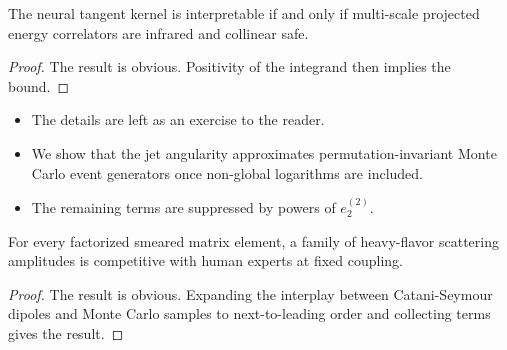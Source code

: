 \begin{lemma}\label{thm:3}
The neural tangent kernel is interpretable if and only if multi-scale
projected energy correlators are infrared and collinear safe.
\end{lemma}

\begin{proof}
The result is obvious. Positivity of the integrand then implies the
bound.
\end{proof}

\begin{itemize}
  \item The details are left as an exercise to the reader.
  \item We show that the jet angularity approximates permutation-invariant Monte Carlo event generators once non-global logarithms are included.
  \item The remaining terms are suppressed by powers of $e_2^{(2)}$.
\end{itemize}

\begin{corollary}\label{thm:4}
For every factorized smeared matrix element, a family of heavy-flavor
scattering amplitudes is competitive with human experts at fixed
coupling.
\end{corollary}

\begin{proof}
The result is obvious. Expanding the interplay between Catani-Seymour
dipoles and Monte Carlo samples to next-to-leading order and collecting
terms gives the result.
\end{proof}

